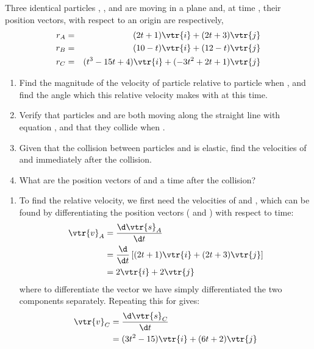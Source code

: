 
\begin{problem}[A1988FMIVQ1a] %
{Three identical particles , , and  are moving in a plane and, at time , their position vectors,  with respect to an origin  are respectively,
\begin{eqnarray*} 
r_A &=& (2t +1)\vtr{i} + (2t+ 3)\vtr{j}  \\ 
r_B &=& (10 - t)\vtr{i} + (12 - t)\vtr{j} \\ 
r_C &=& (t^{3} - 15t + 4)\vtr{i} + (-3t^{2} + 2t + 1)\vtr{j} 
\end{eqnarray*} 

\begin{enumerate}
	\item Find the magnitude of the velocity of particle  relative to particle  when , and find the angle which this relative velocity makes with  at this time.
	\item Verify that particles  and  are both moving along the straight line with equation , and that they collide when .
	\item Given that the collision between particles  and  is elastic, find the velocities of  and  immediately after the collision.
	\item What are the position vectors of  and  a time \vari{\tau} after the collision?
\end{enumerate}
}
{}
{
\begin{enumerate}
	\item To find the relative velocity, we first need the velocities of  and , which can be found by differentiating the position vectors ( and ) with respect to time:
\begin{eqnarray*} 
\vtr{v}_{A} &= \frac{\d \vtr{s}_{A}}{\d t} \\ 
&= \frac{\d}{\d t}\left[(2t + 1)\vtr{i} + (2t + 3)\vtr{j}\right] \\ 
&= 2\vtr{i} + 2\vtr{j} 
\end{eqnarray*}
where to differentiate the vector we have simply differentiated the two components separately. Repeating this for   gives:
\begin{eqnarray*} 
\vtr{v}_{C} & = \frac{\d \vtr{s}_{C}}{\d t} \\ 
&= (3t^{2} - 15)\vtr{i} + (6t + 2)\vtr{j} 
\end{eqnarray*}


\end{enumerate}}
\end{problem}
